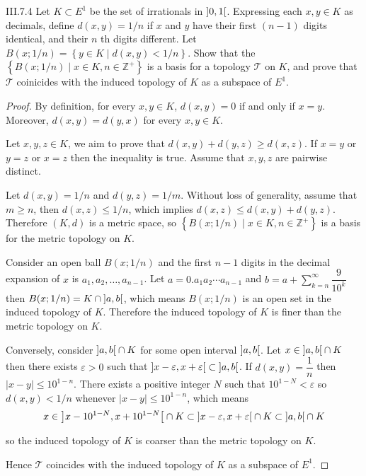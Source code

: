 \begin{problem}{III.7.4}
Let \(K \subset E^{1}\) be the set of irrationals in \( \left\rbrack{0,1}\right\lbrack \). Expressing each \(x, y\in K\) as decimals, define \( d(x, y) = 1/n \) if \(x\) and \(y\) have their first \( (n - 1) \) digits identical, and their \(n\) th digits different. Let \( B(x; 1/n) = \left\{ y \in K \mid d(x, y) < 1/n \right\} \). Show that the \( \left\{ B(x; 1/n) \mid x \in K, n \in \mathbb{Z}^{+} \right\} \) is a basis for a topology \( \mathscr{T} \) on \(K\), and prove that \( \mathscr{T} \) coinicides with the induced topology of \(K\) as a subspace of \(E^{1}\).
\end{problem}

\begin{proof}
	By definition, for every \( x, y \in K \), \( d(x, y) = 0 \) if and only if \( x = y \). Moreover, \( d(x, y) = d(y, x) \) for every \( x, y \in K \).

	Let \( x, y, z \in K \), we aim to prove that \( d(x, y) + d(y, z) \ge d(x, z) \). If \( x = y \) or \( y = z \) or \( x = z \) then the inequality is true. Assume that \( x, y, z \) are pairwise distinct.

	Let \( d(x, y) = 1/n \) and \( d(y, z) = 1/m \). Without loss of generality, assume that \( m \ge n \), then \( d(x, z) \le 1/n \), which implies \( d(x, z) \le d(x, y) + d(y, z) \). Therefore \( (K, d) \) is a metric space, so \( \left\{ B(x; 1/n) \mid x \in K, n \in \mathbb{Z}^{+} \right\} \) is a basis for the metric topology on \( K \).

	Consider an open ball \( B(x; 1/n) \) and the first \( n - 1 \) digits in the decimal expansion of \( x \) is \( a_{1}, a_{2}, \ldots, a_{n-1} \). Let \( a = 0.a_{1}a_{2}\cdots a_{n-1} \) and \( b = a + \sum^{\infty}_{k=n}\dfrac{9}{10^{k}} \) then \( B(x; 1/n) = K \cap \left\rbrack{a, b}\right\lbrack \), which means \( B(x; 1/n) \) is an open set in the induced topology of \( K \). Therefore the induced topology of \(K\) is finer than the metric topology on \( K \).

	Conversely, consider \( \left\rbrack{a, b}\right\lbrack \cap K \) for some open interval \( \left\rbrack{a, b}\right\lbrack \). Let \( x \in \left\rbrack{a, b}\right\lbrack \cap K \) then there exists \( \varepsilon > 0 \) such that \( \left\rbrack{x - \varepsilon, x + \varepsilon}\right\lbrack \subset \left\rbrack{a, b}\right\lbrack \). If \( d(x, y) = \dfrac{1}{n} \) then \( \left\vert{x - y}\right\vert \le 10^{1-n} \). There exists a positive integer \(N\) such that \( 10^{1-N} < \varepsilon \) so \( d(x, y) < 1/n \) whenever \( \left\vert{x - y}\right\vert \le 10^{1-n} \), which means
	\[
		x \in \left\rbrack{x - 10^{1-N}, x + 10^{1-N}}\right\lbrack \cap K \subset \left\rbrack{x - \varepsilon, x + \varepsilon}\right\lbrack \cap K \subset \left\rbrack{a, b}\right\lbrack \cap K
	\]

	so the induced topology of \( K \) is coarser than the metric topology on \( K \).

	Hence \( \mathscr{T} \) coincides with the induced topology of \(K\) as a subspace of \( E^{1} \).
\end{proof}

